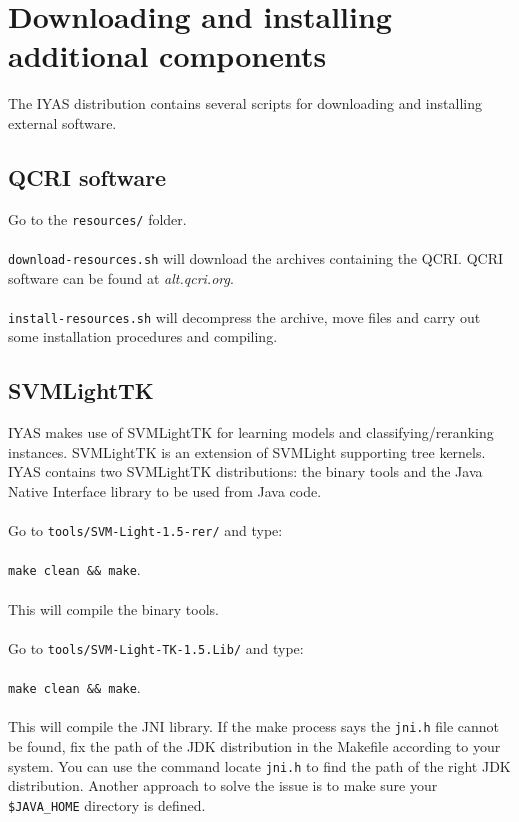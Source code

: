\documentclass{wileysev}
\begin{document}
\section[Downloading and installing additional components]{Downloading and installing additional components}

The IYAS distribution contains several scripts for downloading and installing external software.

\subsection[QCRI software]{QCRI software}

Go to the \texttt{resources/} folder.
\\\\
\texttt{download-resources.sh} will download the archives containing the QCRI. QCRI software can be found at \textit{alt.qcri.org}.
\\\\
\texttt{install-resources.sh} will decompress the archive, move files and carry out some installation procedures and compiling. 

\subsection[SVMLightTK]{SVMLightTK}

IYAS makes use of SVMLightTK for learning models and classifying/reranking instances. SVMLightTK is an extension of SVMLight supporting tree kernels. IYAS contains two SVMLightTK distributions: the binary tools and the Java Native Interface library to be used from Java code.
\\\\
Go to \texttt{tools/SVM-Light-1.5-rer/} and type:
\\\\
\texttt{make clean \&\& make}.
\\\\
This will compile the binary tools.
\\\\
Go to \texttt{tools/SVM-Light-TK-1.5.Lib/} and type:
\\\\
\texttt{make clean \&\& make}.
\\\\
This will compile the JNI library. If the make process says the \texttt{jni.h} file cannot be found, fix the path of the JDK distribution in the Makefile according to your system. You can use the command locate \texttt{jni.h} to find the path of the right JDK distribution. Another approach to solve the issue is to make sure your \texttt{\$JAVA\_HOME} directory is defined.
\end{document}
